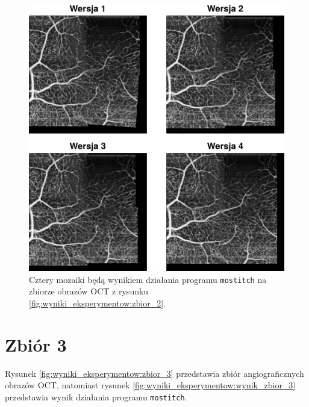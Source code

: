 \begin{figure}[htb]
  \centering
  \includegraphics[width=\textwidth]{gfx/wynik_zbior_2}
  \caption{Cztery mozaiki będą wynikiem działania programu \texttt{mostitch} na zbiorze obrazów OCT z rysunku \ref{fig:wyniki_eksperymentow:zbior_2}.}
  \label{fig:wyniki_eksperymentow:wynik_zbior_2}
\end{figure}

\section{Zbiór 3}
\label{sec:zbior_3}

Rysunek \ref{fig:wyniki_eksperymentow:zbior_3} przedstawia zbiór angiograficznych obrazów OCT, natomiast rysunek \ref{fig:wyniki_eksperymentow:wynik_zbior_3} przedstawia wynik działania programu \texttt{mostitch}.

